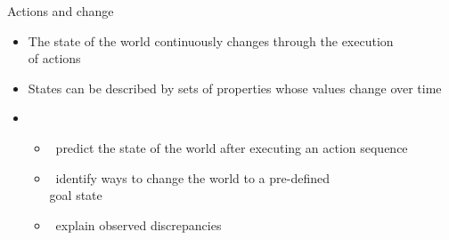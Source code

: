 \begin{frame}{Actions and change}
  \begin{itemize}
  \item The state of the world continuously changes through the execution\\ of actions
  \item States can be described by sets of properties whose values change over time
    \bigskip\pause
  \item {}
    \begin{itemize}\normalsize
    \item {}  \ predict the state of the world after executing an action sequence
      \smallskip
    \item {}    \ identify ways to change the world to a pre-defined\\ goal state
      \smallskip
    \item {} \ explain observed discrepancies
    \end{itemize}
  \end{itemize}
\end{frame}
%

